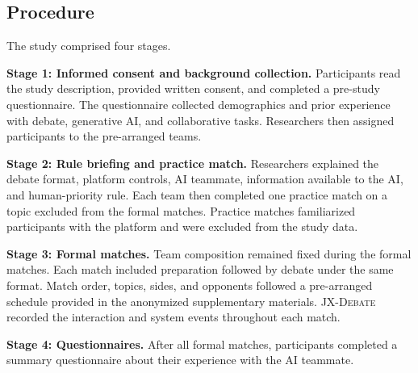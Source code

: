 \documentclass[manuscript,review,anonymous]{acmart}
\begin{document}
\subsection{Procedure}

The study comprised four stages.

\noindent\textbf{Stage 1: Informed consent and background collection.}
Participants read the study description, provided written consent, and completed a pre-study questionnaire. The questionnaire collected demographics and prior experience with debate, generative AI, and collaborative tasks. Researchers then assigned participants to the pre-arranged teams.

\noindent\textbf{Stage 2: Rule briefing and practice match.}
Researchers explained the debate format, platform controls, AI teammate, information available to the AI, and human-priority rule. Each team then completed one practice match on a topic excluded from the formal matches. Practice matches familiarized participants with the platform and were excluded from the study data.

\noindent\textbf{Stage 3: Formal matches.}
Team composition remained fixed during the formal matches. Each match included preparation followed by debate under the same format. Match order, topics, sides, and opponents followed a pre-arranged schedule provided in the anonymized supplementary materials. \textsc{JX-Debate} recorded the interaction and system events throughout each match.

\noindent\textbf{Stage 4: Questionnaires.}
After all formal matches, participants completed a summary questionnaire about their experience with the AI teammate.
\end{document}

